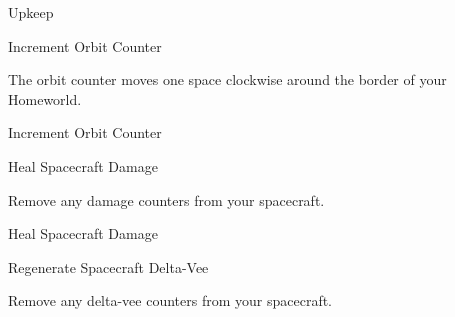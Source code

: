 \documentclass[twoside]{minimal}
\newenvironment{section}[1]
{\renewcommand{\title}{\begin{center} \fontsize{24.88}{32}\selectfont #1 \end{center}} \ignorespaces}
{\clearpage \ignorespacesafterend}
\newenvironment{supersection}[1]
{
\renewcommand{\title}{\begin{center} \fontsize{24.88}{32}\selectfont #1 \end{center}}
\renewenvironment{section}[1]
 {\title \renewcommand{\title}{\begin{flushleft} \fontsize{20.74}{28}\selectfont ##1 \end{flushleft}} \ignorespaces}
 {\clearpage \ignorespacesafterend}
\ignorespaces
}
{\clearpage \ignorespacesafterend}
\begin{document}
\begin{supersection}{Upkeep}
    \begin{section}{Increment Orbit Counter}
        \title

        The orbit counter moves one space clockwise around the border of your Homeworld.
    \end{section}

    \begin{section}{Heal Spacecraft Damage}
        \title

        Remove any damage counters from your spacecraft.
    \end{section}

    \begin{section}{Regenerate Spacecraft Delta-Vee}
        \title

        Remove any delta-vee counters from your spacecraft.
    \end{section}
\end{supersection}
\end{document}
